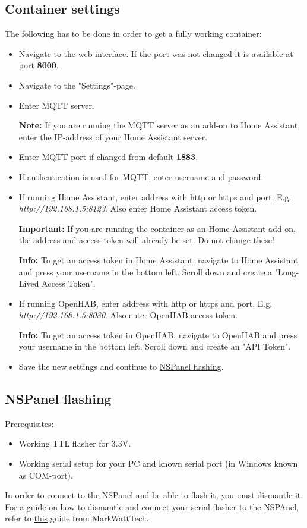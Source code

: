 \documentclass[10pt]{article}
\newcommand{\info}[1]{\begin{infoBox} \textbf{Info:} #1 \end{infoBox}}
\newcommand{\note}[1]{\begin{noteBox} \textbf{Note:} #1 \end{noteBox}}
\newcommand{\important}[1]{\begin{importantBox} \textbf{Important:} #1 \end{importantBox}}
\begin{document}
    \subsection{Container settings}
    The following has to be done in order to get a fully working container:
    \begin{itemize}
      \item Navigate to the web interface. If the port was not changed it is available at port \textbf{8000}.
      \item Navigate to the "Settings"-page.
      \item Enter MQTT server.
        \note{If you are running the MQTT server as an add-on to Home Assistant, enter the IP-address of your Home Assistant server.}
      \item Enter MQTT port if changed from default \textbf{1883}.
      \item If authentication is used for MQTT, enter username and password.
      \item If running Home Assistant, enter address with http or https and port, E.g. \textit{http://192.168.1.5:8123}. Also enter Home Assistant access token.
      \important{If you are running the container as an Home Assistant add-on, the address and access token will already be set. Do not change these!}
      \info{To get an access token in Home Assistant, navigate to Home Assistant and press your username in the bottom left. Scroll down and create a "Long-Lived Access Token".}
      \item If running OpenHAB, enter address with http or https and port, E.g. \textit{http://192.168.1.5:8080}. Also enter OpenHAB access token.
      \info{To get an access token in OpenHAB, navigate to OpenHAB and press your username in the bottom left. Scroll down and create an "API Token".}
    \item Save the new settings and continue to \hyperref[sec:nspanel_flashing]{NSPanel flashing}.
    \end{itemize}

    \subsection{NSPanel flashing}
    \label{sec:nspanel_flashing}
    Prerequisites:
    \begin{itemize}
      \item Working TTL flasher for 3.3V.
      \item Working serial setup for your PC and known serial port (in Windows known as COM-port).
    \end{itemize}
    In order to connect to the NSPanel and be able to flash it, you must dismantle it. For a guide on how to dismantle and connect your serial flasher to the NSPAnel, refer to \href{https://www.youtube.com/watch?v=p-AK4o5jOSI}{this} guide from MarkWattTech.
\end{document}
